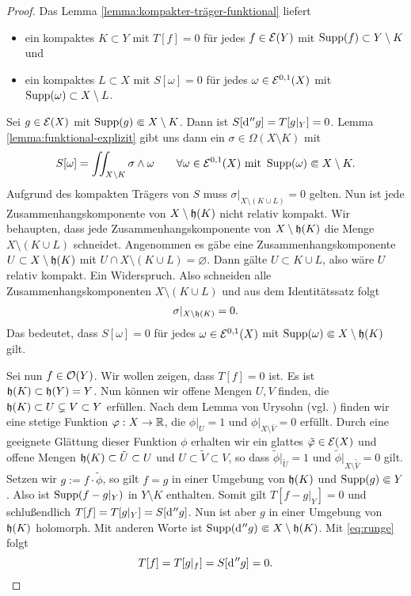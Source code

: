 \begin{proof}
  Das Lemma \ref{lemma:kompakter-träger-funktional} liefert
  \begin{itemize}
  \item ein kompaktes $K \subset Y$ mit $T[f] = 0$ für jedes $f \in
    \mathcal{E}(Y)$ mit $\operatorname{Supp}(f) \subset Y \setminus K$ und
  \item ein kompaktes $L \subset X$ mit $S[\omega] = 0$ für jedes
    $\omega \in \mathcal{E}^{0,1}(X)$ mit $\operatorname{Supp}(\omega) \subset X\setminus L$.
  \end{itemize}
   Sei $g \in \mathcal{E}(X)$ mit $\operatorname{Supp}(g) \Subset X \setminus K$. Dann ist
   $S[\d[''g]] = T[g|_Y]  = 0$. Lemma \ref{lemma:funktional-explizit}
   gibt uns dann ein $\sigma \in \Omega(X\setminus K)$ mit
   \[
   S[\omega] = \iint_{X \setminus K}\sigma \wedge \omega \qquad
   \forall \omega \in \mathcal{E}^{0,1}(X) \text{ mit } \operatorname{Supp}(\omega)
   \Subset X\setminus K.
   \]
   Aufgrund des kompakten Trägers von $S$ muss $\sigma|_{X \setminus
     (K \cup L)} = 0$ gelten. 
   Nun ist jede Zusammenhangskomponente von $X \setminus \mathfrak{h}(K)$
   nicht relativ kompakt. 
   Wir behaupten, dass jede Zusammenhangskomponente von $X \setminus
   \mathfrak{h}(K)$ die Menge $X \setminus (K \cup L)$ schneidet.
   Angenommen es gäbe eine Zusammenhangskomponente $U \subset X
   \setminus \mathfrak{h}(K)$ mit $U \cap X \setminus ( K \cup L) =
   \varnothing$. Dann gälte $U \subset K \cup L$, also wäre $U$ relativ
   kompakt. Ein Widerspruch. Also schneiden alle
   Zusammenhangskomponenten $X \setminus (K \cup L)$ und aus dem
   Identitätssatz folgt
   \begin{align}
   \sigma|_{X \setminus \mathfrak{h}(K)} = 0. \label{eq:runge}
   \end{align}
   Das bedeutet, dass $S[\omega] = 0$ für jedes $\omega \in
   \mathcal{E}^{0,1}(X)$ mit $\operatorname{Supp}(\omega) \Subset X \setminus
   \mathfrak{h}(K)$ gilt.

   Sei nun $f \in \mathcal{O}(Y)$. Wir wollen zeigen, dass $T[f] = 0$ ist. 
   Es ist $\mathfrak{h}(K) \subset \mathfrak{h}(Y) = Y$. Nun können wir
   offene Mengen $U, V$ finden, die $ \mathfrak{h}(K) \subset U
   \subsetneq V \subset Y$ erfüllen. Nach dem Lemma von Urysohn
   (vgl. \cite[Satz 12.2]{Jam}) finden
   wir eine stetige Funktion $\varphi: X \rightarrow \mathbb{R}$, die $\phi|_U = 1$
   und $\phi|_{X \setminus \bar V} = 0$ erfüllt. Durch eine geeignete Glättung
   dieser Funktion $\phi$ erhalten wir ein glattes $\tilde {\varphi} \in
   \mathcal{E}(X)$ und offene Mengen $\mathfrak{h}(K) \subset \tilde U \subset U$
   und $U \subset \tilde V \subset V$, so dass $\tilde \phi|_{\tilde
     U} = 1$ und $\tilde \phi|_{X \setminus \tilde {\bar V}} =
   0$ gilt. Setzen wir $ g := f \cdot \tilde \phi$, so gilt
   $f = g$ in einer Umgebung von $\mathfrak{h}(K)$ und $\operatorname{Supp}(g) \Subset Y$.
   Also ist $\operatorname{Supp}(f - g|_Y)$ in $Y \setminus K$ enthalten. Somit gilt $T[f- g|_Y] = 0$
   und schlußendlich $T[f] = T[g|_Y] = S[\d[''g]]$. 
   Nun ist aber $g$ in einer Umgebung von $\mathfrak{h}(K)$ holomorph. Mit
   anderen Worte ist $\Supp(\d[''g]) \Subset X \setminus \runge(K)$.
   Mit \eqref{eq:runge} folgt
   \[
   T[f] = T[g|_f] = S[\d[''g]] = 0.
   \]
\end{proof}

